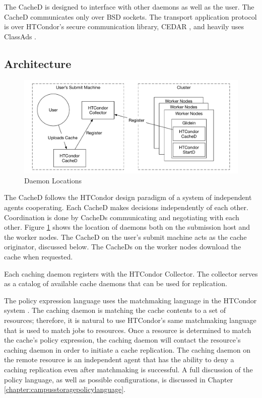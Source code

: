 The CacheD is designed to interface with other daemons as well as the user.  The CacheD communicates only over BSD sockets. The transport application protocol is over HTCondor's secure communication library, CEDAR \cite{miller2010flexible}, and heavily uses ClassAds \cite{raman1998matchmaking}.  

\subsection{Architecture}

\begin{figure}[ht]
	\centering
	\includegraphics[width=\textwidth]{images/DaemonLayout.pdf}
	\caption{Daemon Locations}
	\label{fig:daemonlayout}
\end{figure}


The CacheD follows the HTCondor design paradigm of a system of independent agents cooperating.  Each CacheD makes decisions independently of each other.  Coordination is done by CacheDs communicating and negotiating with each other.  Figure \ref{fig:daemonlayout} shows the location of daemons both on the submission host and the worker nodes.  The CacheD on the user's submit machine acts as the cache originator, discussed below.  The CacheDs on the worker nodes download the cache when requested.

Each caching daemon registers with the HTCondor Collector.  The collector serves as a catalog of available cache daemons that can be used for replication.

The policy expression language uses the matchmaking language in the HTCondor system \cite{raman1998matchmaking}.  The caching daemon is matching the cache contents to a set of resources; therefore, it is natural to use HTCondor's same matchmaking language that is used to match jobs to resources.  Once a resource is determined to match the cache's policy expression, the caching daemon will contact the resource's caching daemon in order to initiate a cache replication.  The caching daemon on the remote resource is an independent agent that has the ability to deny a caching replication even after matchmaking is successful.  A full discussion of the policy language, as well as possible configurations, is discussed in Chapter \ref{chapter:campusstoragepolicylanguage}.

